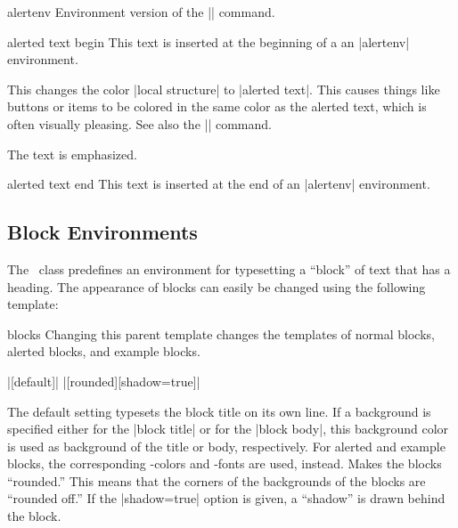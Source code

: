 \begin{environment}{{alertenv}}
  Environment version of the |\alert| command.

  \begin{element}{alerted text begin}\yes\no\no
    This text is inserted at the beginning of a an |alertenv| environment.

    \begin{templateoptions}

      \beamernote
      This changes the color |local structure| to |alerted text|. This causes things like buttons or items to be colored in the same color as the alerted text, which is often visually pleasing. See also the |\structure| command.

      \articlenote
      The text is emphasized.
    \end{templateoptions}
  \end{element}

  \begin{element}{alerted text end}\yes\no\no
    This text is inserted at the end of an |alertenv| environment.
  \end{element}
\end{environment}


\subsection{Block Environments}
\label{predefined}

The \beamer\ class predefines an environment for typesetting a ``block'' of text that has a heading. The appearance of blocks can easily be changed using the following template:

\begin{element}{blocks}\semiyes\no\no
  Changing this parent template changes the templates of normal blocks, alerted blocks, and example blocks.

  \example
  |[default]|
  \example
  |[rounded][shadow=true]|

  \begin{templateoptions}
    The default setting typesets the block title on its own line. If a background is specified either for the |block title| or for the |block body|, this background color is used as background of the title or body, respectively. For alerted and example blocks, the corresponding \beamer-colors and -fonts are used, instead.
    Makes the blocks ``rounded.'' This means that the corners of the backgrounds of the blocks are ``rounded off.'' If the |shadow=true| option is given, a ``shadow'' is drawn behind the block.
  \end{templateoptions}
\end{element}


